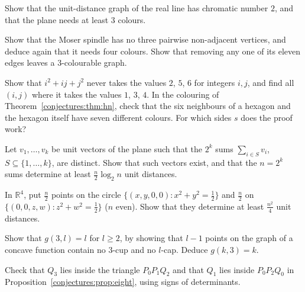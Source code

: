 \begin{exercise}[$\star$]\label{conjectures:ex:linetwo}
Show that the unit-distance graph of the real line has chromatic number $2$, and that the plane needs at least $3$ colours.
\end{exercise}

\begin{exercise}[$\star\star$]\label{conjectures:ex:spindle}
Show that the Moser spindle has no three pairwise non-adjacent vertices, and deduce again that it needs four colours. Show that removing any one of its
eleven edges leaves a $3$-colourable graph.
\end{exercise}

\begin{exercise}[$\star\star$]\label{conjectures:ex:hexcolour}
Show that $i^2+ij+j^2$ never takes the values $2$, $5$, $6$ for integers $i,j$, and find all $(i,j)$ where it takes the values $1$, $3$, $4$. In the
colouring of Theorem~\ref{conjectures:thm:hn}, check that the six neighbours of a hexagon and the hexagon itself have seven different colours. For which
sides $s$ does the proof work?
\end{exercise}

\begin{exercise}[$\star\star$]\label{conjectures:ex:unitcube}
Let $v_1,\dots,v_k$ be unit vectors of the plane such that the $2^k$ sums $\sum_{i\in S}v_i$, $S\subseteq\{1,\dots,k\}$, are distinct. Show that such
vectors exist, and that the $n=2^k$ sums determine at least $\frac n2\log_2n$ unit distances.
\end{exercise}

\begin{exercise}[$\star$]\label{conjectures:ex:lenz}
In $\mathbb R^4$, put $\frac n2$ points on the circle $\{(x,y,0,0):x^2+y^2=\frac12\}$ and $\frac n2$ on $\{(0,0,z,w):z^2+w^2=\frac12\}$ ($n$ even). Show
that they determine at least $\frac{n^2}4$ unit distances.
\end{exercise}

\begin{exercise}[$\star\star$]\label{conjectures:ex:cupcap}
Show that $g(3,l)=l$ for $l\ge2$, by showing that $l-1$ points on the graph of a concave function contain no $3$-cup and no $l$-cap. Deduce $g(k,3)=k$.
\end{exercise}

\begin{exercise}[$\star$]\label{conjectures:ex:pentwitness}
Check that $Q_3$ lies inside the triangle $P_0P_1Q_2$ and that $Q_1$ lies inside $P_0P_2Q_0$ in Proposition~\ref{conjectures:prop:eight}, using signs of
determinants.
\end{exercise}

